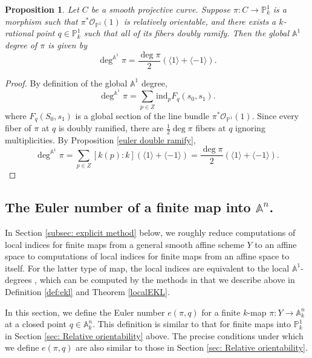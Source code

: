 \documentclass[12pt, reqno]{amsart}
\newtheorem{proposition}[theorem]{Proposition}
\theoremstyle{definition}
\newcommand{\A}{\mathbb{A}} %
\newcommand{\Proj}{\mathbb{P}} %
\newcommand{\Adeg}{\deg^{\mathbb{A}^1}} %
\newcommand{\Oh}{\mathscr{O}} %
\newcommand{\ind}{\mathrm{ind}} %
\begin{document}
\begin{proposition} \label{A1 degree double ramify}
    Let $C$ be a smooth projective curve. Suppose $\pi: C \to \mathbb{P}^1_k$ is a morphism such that $\pi^* \Oh_{\mathbb{P}^1}(1)$ is relatively orientable, and there exists a $k$-rational point $q \in \mathbb{P}^1_k$ such that all of its fibers doubly ramify. Then the global $\A^1$ degree of $\pi$ is given by
    \begin{equation*}
        \Adeg \pi = \frac{\deg \pi}{2} (\langle 1 \rangle + \langle -1 \rangle).
    \end{equation*}
\end{proposition}
\begin{proof}
    By definition of the global $\A^1$ degree,
    \begin{equation*}
        \Adeg \pi = \sum_{p \in Z} \ind_{p} F_q(s_0, s_1).
    \end{equation*}
    where $F_q(S_0,s_1)$ is a global section of the line bundle $\pi^* \Oh_{\mathbb{P}^1}(1)$. Since every fiber of $\pi$ at $q$ is doubly ramified, there are $\frac{1}{2} \deg \pi$ fibers at $q$ ignoring multiplicities. By Proposition \ref{euler double ramify},
    \begin{equation*}
        \Adeg \pi = \sum_{p \in Z} [k(p): k] (\langle 1 \rangle + \langle -1 \rangle) = \frac{\deg \pi}{2} (\langle 1 \rangle + \langle -1 \rangle).
    \end{equation*}
\end{proof}

\subsection{The Euler number of a finite map into $\A^n$.} \label{subsec: euler number into affine}

In Section \ref{subsec: explicit method} below, we roughly reduce computations of local indices for finite maps from a general smooth affine scheme $Y$ to an affine space to computations of local indices for finite maps from an affine space to itself. For the latter type of map, the local indices are equivalent to the local $\A^1$-degrees \cite[Example 32]{kwcubic}, which can be computed by the methods in \cite{kwEKL} that we describe above in Definition \ref{def:ekl} and Theorem \ref{localEKL}.

In this section, we define the Euler number $e(\pi, q)$ for a finite $k$-map $\pi: Y \rightarrow \A^n_k$ at a closed point $q \in \A^n_k$. This definition is similar to that for finite maps into $\Proj^1_k$ in Section \ref{sec: Relative orientability} above. The precise conditions under which we define $e(\pi, q)$ are also similar to those in Section \ref{sec: Relative orientability}.
\end{document}
